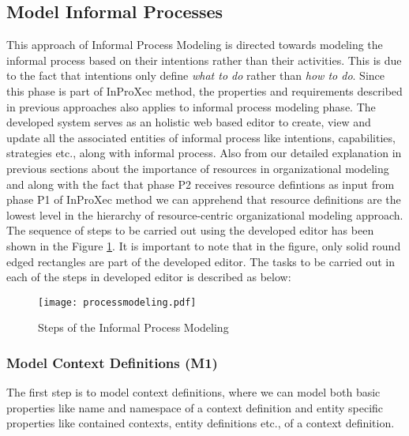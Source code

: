 \subsection{Model Informal Processes}
\label{subsec:informalprocessmodeling}
This approach of Informal Process Modeling is directed towards modeling the informal process based on their intentions rather than their activities. This is due to the fact that intentions only define \textit{what to do} rather than \textit{how to do}. Since this phase is part of InProXec method, the properties and requirements described in previous approaches \cite{Sungur2014a,Sungur2015} also applies to informal process modeling phase. The developed system serves as an holistic web based editor to create, view and update all the associated entities of informal process like intentions, capabilities, strategies etc., along with informal process. Also from our detailed explanation in previous sections about the importance of resources in organizational modeling  and along with the fact that phase P2 receives resource defintions as input from phase P1 of InProXec method we can apprehend that resource definitions are the lowest level in the hierarchy of resource-centric organizational modeling approach. The sequence of steps to be carried out using the developed editor has been shown in the Figure  \ref{fig:processdiagram}. It is important to note that in the figure, only solid round edged rectangles are part of the developed editor. The tasks to be carried out in each of the steps in developed editor is described as below:

\begin{figure}
	\centering
	\texttt{[image: processmodeling.pdf]}
	\caption{Steps of the Informal Process Modeling}
	\label{fig:processdiagram}
\end{figure}

\subsubsection{Model Context Definitions (M1)}  
The first step is to model context definitions, where we can model both basic properties like name and namespace of a context definition and entity specific properties like contained contexts, entity definitions etc., of a context definition.  

